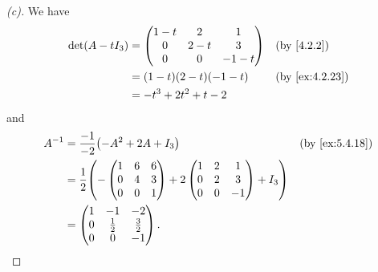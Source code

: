 \begin{proof}[(c)]
  We have
  \begin{align*}
    \det(A - t I_3) & = \begin{pmatrix}
                          1 - t & 2     & 1      \\
                          0     & 2 - t & 3      \\
                          0     & 0     & -1 - t
                        \end{pmatrix} &  & \text{(by \cref{4.2.2})}               \\
                    & = (1 - t)(2 - t)(-1 - t)  &  & \text{(by \cref{ex:4.2.23})} \\
                    & = -t^3 + 2t^2 + t - 2
  \end{align*}
  and
  \begin{align*}
    A^{-1} & = \frac{-1}{-2} \pa{-A^2 + 2A + I_3} &  & \text{(by \cref{ex:5.4.18})} \\
           & = \frac{1}{2} \pa{-\begin{pmatrix}
                                    1 & 6 & 6 \\
                                    0 & 4 & 3 \\
                                    0 & 0 & 1
                                  \end{pmatrix} + 2\begin{pmatrix}
                                                     1 & 2 & 1  \\
                                                     0 & 2 & 3  \\
                                                     0 & 0 & -1
                                                   \end{pmatrix} + I_3}               \\
           & = \begin{pmatrix}
                 1 & -1          & -2          \\
                 0 & \frac{1}{2} & \frac{3}{2} \\
                 0 & 0           & -1
               \end{pmatrix}.
  \end{align*}
\end{proof}

